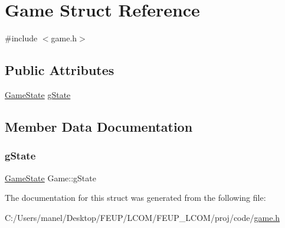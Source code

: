 \hypertarget{struct_game}{}\section{Game Struct Reference}
\label{struct_game}


{\ttfamily \#include $<$game.\+h$>$}

\subsection*{Public Attributes}
\begin{DoxyCompactItemize}
\item 
\mbox{\hyperlink{group__game_ga7899b65f1ea0f655e4bbf8d2a5714285}{Game\+State}} \mbox{\hyperlink{struct_game_a5025796ab1e0e6011470d95c154273fb}{g\+State}}
\end{DoxyCompactItemize}


\subsection{Member Data Documentation}
\mbox{\label{struct_game_a5025796ab1e0e6011470d95c154273fb}} 
\subsubsection{\texorpdfstring{gState}{gState}}
{\footnotesize\ttfamily \mbox{\hyperlink{group__game_ga7899b65f1ea0f655e4bbf8d2a5714285}{Game\+State}} Game\+::g\+State}



The documentation for this struct was generated from the following file\+:\begin{DoxyCompactItemize}
\item 
C\+:/\+Users/manel/\+Desktop/\+F\+E\+U\+P/\+L\+C\+O\+M/\+F\+E\+U\+P\+\_\+\+L\+C\+O\+M/proj/code/\mbox{\hyperlink{game_8h}{game.\+h}}\end{DoxyCompactItemize}
